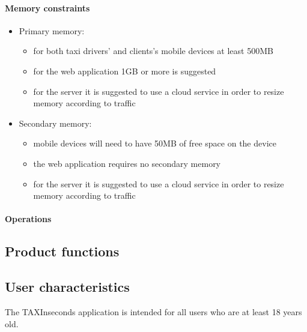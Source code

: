 \documentclass{article}
\begin{document}
\paragraph{Memory constraints} 
\begin{itemize}
	\item Primary memory:
		\begin{itemize}
			\item for both taxi drivers' and clients's mobile devices at least 500MB 
			\item for the web application 1GB or more is suggested
			\item for the server it is suggested to use a cloud service in order to resize memory according to traffic
		\end{itemize}
	\item Secondary memory:
		\begin{itemize}
			\item mobile devices will need to have 50MB of free space on the device
			\item the web application requires no secondary memory 
			\item for the server it is suggested to use a cloud service in order to resize memory according to traffic
		\end{itemize}
\end{itemize}
\paragraph{Operations} 

\subsection{Product functions}
\subsection{User characteristics}
The TAXInseconds application is intended for all users who are at least 18 years old.

\end{document}
